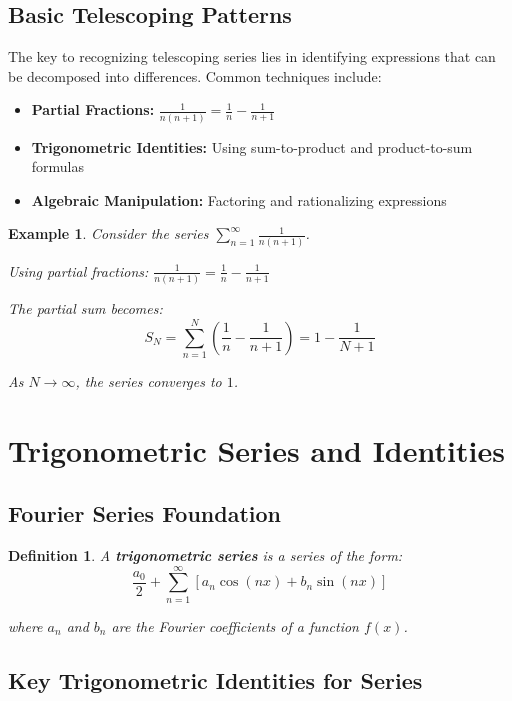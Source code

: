 \documentclass[12pt]{article}
\newtheorem{definition}{Definition}
\newtheorem{example}{Example}
\begin{document}
\subsection{Basic Telescoping Patterns}

The key to recognizing telescoping series lies in identifying expressions that can be decomposed into differences. Common techniques include:

\begin{itemize}
\item \textbf{Partial Fractions:} $\frac{1}{n(n+1)} = \frac{1}{n} - \frac{1}{n+1}$
\item \textbf{Trigonometric Identities:} Using sum-to-product and product-to-sum formulas
\item \textbf{Algebraic Manipulation:} Factoring and rationalizing expressions
\end{itemize}

\begin{example}
Consider the series $\sum_{n=1}^{\infty} \frac{1}{n(n+1)}$.

Using partial fractions: $\frac{1}{n(n+1)} = \frac{1}{n} - \frac{1}{n+1}$

The partial sum becomes:
$$S_N = \sum_{n=1}^{N} \left(\frac{1}{n} - \frac{1}{n+1}\right) = 1 - \frac{1}{N+1}$$

As $N \to \infty$, the series converges to $1$.
\end{example}

\section{Trigonometric Series and Identities}

\subsection{Fourier Series Foundation}

\begin{definition}
A \textbf{trigonometric series} is a series of the form:
$$\frac{a_0}{2} + \sum_{n=1}^{\infty} [a_n \cos(nx) + b_n \sin(nx)]$$

where $a_n$ and $b_n$ are the Fourier coefficients of a function $f(x)$.
\end{definition}

\subsection{Key Trigonometric Identities for Series}
\end{document}
